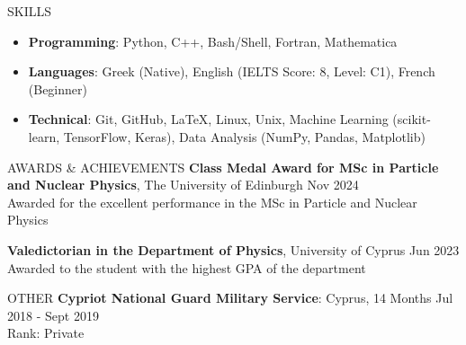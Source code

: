 \documentclass{resume} %
\begin{document}
        \bigbreak

        \begin{rSection}{SKILLS}
                \begin{itemize}
                        \itemsep -3pt {} 
                        \item \textbf{Programming}: Python, C++, Bash/Shell, Fortran, Mathematica
                        \item \textbf{Languages}: Greek (Native), English (IELTS Score: 8, Level: C1), French (Beginner)
                        \item \textbf{Technical}: Git, GitHub, \LaTeX, Linux, Unix, Machine Learning (scikit-learn, TensorFlow, Keras), Data Analysis (NumPy, Pandas, Matplotlib)
                \end{itemize}
        \end{rSection}

        \bigbreak

        \begin{rSection}{AWARDS \& ACHIEVEMENTS}
                {\bf Class Medal Award for MSc in Particle and Nuclear Physics}, The University of Edinburgh \hfill Nov 2024\\
                Awarded for the excellent performance in the MSc in Particle and Nuclear Physics

                {\bf Valedictorian in the Department of Physics}, University of Cyprus \hfill Jun 2023\\
                Awarded to the student with the highest GPA of the department
                
                
        \end{rSection} 

        \bigbreak

        \begin{rSection}{OTHER}
                {\bf Cypriot National Guard Military Service}: Cyprus, 14 Months \hfill {Jul 2018 - Sept 2019}\\
                Rank: Private
        \end{rSection}

        \bigbreak

\end{document}
